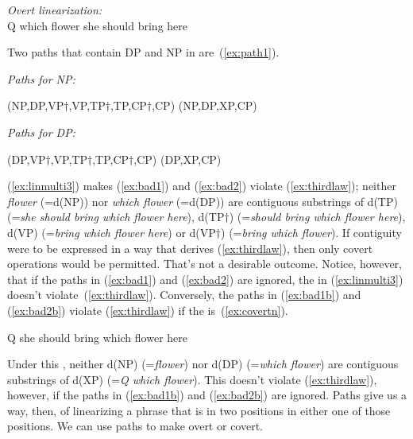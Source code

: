 \documentclass[output=paper]{langsci/langscibook}
\begin{document}
\begin{exe}
	\ex \label{ex:linmulti3} \emph{Overt  linearization:}\\[3pt] Q which flower she should bring here
\end{exe}

Two paths that contain DP and NP in  are~(\ref{ex:path1}).

\begin{exe}
	\ex \label{ex:path1}
	\begin{xlist}
		\ex \emph{Paths for NP:}
		\begin{xlist}
		\ex \label{ex:bad1} (NP,DP,VP$\dag$,VP,TP$\dag$,TP,CP$\dag$,CP)
		\ex \label{ex:bad1b}(NP,DP,XP,CP)
		\end{xlist}
		\ex \emph{Paths for DP:}
		\begin{xlist}
			\ex \label{ex:bad2} (DP,VP$\dag$,VP,TP$\dag$,TP,CP$\dag$,CP)
			\ex \label{ex:bad2b}(DP,XP,CP)
		\end{xlist}
	\end{xlist}
\end{exe}

(\ref{ex:linmulti3}) makes (\ref{ex:bad1}) and (\ref{ex:bad2}) violate (\ref{ex:thirdlaw}); neither \emph{flower} (=d(NP)) nor \emph{which flower} (=d(DP)) are contiguous substrings of d(TP) (=\emph{she should bring which flower here}), d(TP$\dag$) (=\emph{should bring which flower here}), d(VP) (=\emph{bring which flower here}) or d(VP$\dag$) (=\emph{bring which flower}). If contiguity were to be expressed in a way that derives (\ref{ex:thirdlaw}), then only covert  operations would be permitted. That's not a desirable outcome. Notice, however, that if the paths in (\ref{ex:bad1}) and (\ref{ex:bad2}) are ignored, the  in (\ref{ex:linmulti3}) doesn't violate~(\ref{ex:thirdlaw}). Conversely, the paths in (\ref{ex:bad1b}) and (\ref{ex:bad2b}) violate (\ref{ex:thirdlaw}) if the  is~(\ref{ex:covertn}).
\begin{exe}
	\ex \label{ex:covertn} Q she should bring which flower here
\end{exe}

Under this , neither d(NP) (=\emph{flower}) nor d(DP) (=\emph{which flower}) are contiguous substrings of d(XP) (=\emph{Q which flower}). This  doesn't violate (\ref{ex:thirdlaw}), however, if the paths in (\ref{ex:bad1b}) and (\ref{ex:bad2b}) are ignored. Paths give us a way, then, of linearizing a phrase that is in two positions in either one of those positions. We can use paths to make  overt or covert.
\end{document}

